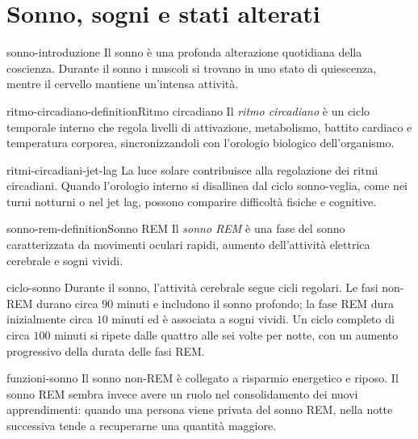 \documentclass[preview]{standalone}
\begin{document}
\genpage

\section{Sonno, sogni e stati alterati}

\begin{snippet}{sonno-introduzione}
    Il sonno è una profonda alterazione quotidiana della coscienza. Durante il
    sonno i muscoli si trovano in uno stato di quiescenza, mentre il cervello
    mantiene un'intensa attività.
\end{snippet}

\begin{snippetdefinition}{ritmo-circadiano-definition}{Ritmo circadiano}
    Il \emph{ritmo circadiano} è un ciclo temporale interno che regola livelli
    di attivazione, metabolismo, battito cardiaco e temperatura corporea,
    sincronizzandoli con l'orologio biologico dell'organismo.
\end{snippetdefinition}

\begin{snippet}{ritmi-circadiani-jet-lag}
    La luce solare contribuisce alla regolazione dei ritmi circadiani. Quando
    l'orologio interno si disallinea dal ciclo sonno-veglia, come nei turni
    notturni o nel jet lag, possono comparire difficoltà fisiche e cognitive.
\end{snippet}

\begin{snippetdefinition}{sonno-rem-definition}{Sonno REM}
    Il \emph{sonno REM} è una fase del sonno caratterizzata da movimenti oculari
    rapidi, aumento dell'attività elettrica cerebrale e sogni vividi.
\end{snippetdefinition}

\begin{snippet}{ciclo-sonno}
    Durante il sonno, l'attività cerebrale segue cicli regolari. Le fasi
    non-REM durano circa \(90\) minuti e includono il sonno profondo; la fase
    REM dura inizialmente circa \(10\) minuti ed è associata a sogni vividi. Un
    ciclo completo di circa \(100\) minuti si ripete dalle quattro alle sei
    volte per notte, con un aumento progressivo della durata delle fasi REM.
\end{snippet}


\begin{snippet}{funzioni-sonno}
    Il sonno non-REM è collegato a risparmio energetico e riposo. Il sonno REM
    sembra invece avere un ruolo nel consolidamento dei nuovi apprendimenti:
    quando una persona viene privata del sonno REM, nella notte successiva tende
    a recuperarne una quantità maggiore.
\end{snippet}
\end{document}
